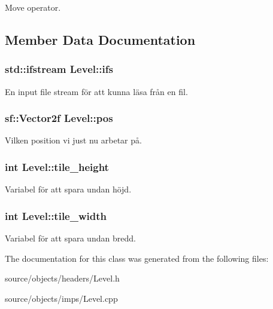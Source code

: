 Move operator. 



\subsection{Member Data Documentation}
\hypertarget{classLevel_aa1a8e3b1ba0606c3c461624b5af8172c}{
\subsubsection[{ifs}]{\setlength{\rightskip}{0pt plus 5cm}std\+::ifstream Level\+::ifs\hspace{0.3cm}{\ttfamily [private]}}}\label{classLevel_aa1a8e3b1ba0606c3c461624b5af8172c}


En input file stream för att kunna läsa från en fil. 

\hypertarget{classLevel_a23a51431287bd8692a998de1b1fdf884}{
\subsubsection[{pos}]{\setlength{\rightskip}{0pt plus 5cm}sf\+::\+Vector2f Level\+::pos\hspace{0.3cm}{\ttfamily [private]}}}\label{classLevel_a23a51431287bd8692a998de1b1fdf884}


Vilken position vi just nu arbetar på. 

\hypertarget{classLevel_a75ae0539332f57c52edac380fa0fc0c3}{
\subsubsection[{tile\+\_\+height}]{\setlength{\rightskip}{0pt plus 5cm}int Level\+::tile\+\_\+height\hspace{0.3cm}{\ttfamily [private]}}}\label{classLevel_a75ae0539332f57c52edac380fa0fc0c3}


Variabel för att spara undan höjd. 

\hypertarget{classLevel_ac846cb2f8b1bd0f92a60a484ce1e50ef}{
\subsubsection[{tile\+\_\+width}]{\setlength{\rightskip}{0pt plus 5cm}int Level\+::tile\+\_\+width\hspace{0.3cm}{\ttfamily [private]}}}\label{classLevel_ac846cb2f8b1bd0f92a60a484ce1e50ef}


Variabel för att spara undan bredd. 



The documentation for this class was generated from the following files\+:\begin{DoxyCompactItemize}
\item 
source/objects/headers/Level.\+h\item 
source/objects/imps/Level.\+cpp\end{DoxyCompactItemize}
